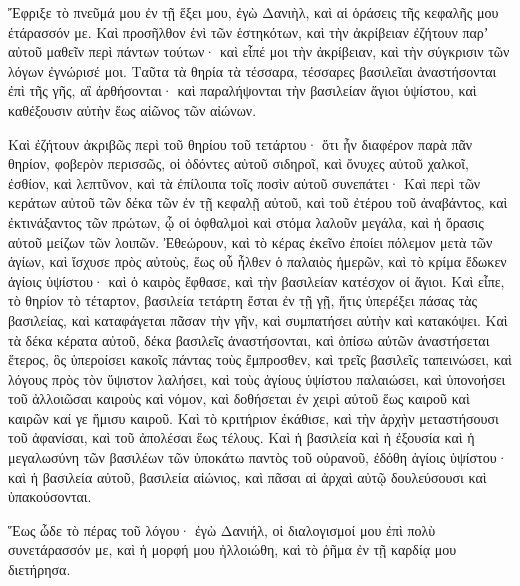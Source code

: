 {\par }{\PP {}Ἔφριξε τὸ πνεῦμά μου ἐν τῇ ἕξει μου, ἐγὼ Δανιὴλ, καὶ αἱ ὁράσεις τῆς κεφαλῆς μου ἐτάρασσόν με.
Καὶ προσῆλθον ἑνὶ τῶν ἑστηκότων, καὶ τὴν ἀκρίβειαν ἐζήτουν παρʼ αὐτοῦ μαθεῖν περὶ πάντων τούτων· καὶ εἶπέ μοι τὴν ἀκρίβειαν, καὶ τὴν σύγκρισιν τῶν λόγων ἐγνώρισέ μοι.
Ταῦτα τὰ θηρία τὰ τέσσαρα, τέσσαρες βασιλεῖαι ἀναστήσονται ἐπὶ τῆς γῆς, αἳ ἀρθήσονται·
καὶ παραλήψονται τὴν βασιλείαν ἅγιοι ὑψίστου, καὶ καθέξουσιν αὐτὴν ἕως αἰῶνος τῶν αἰώνων.
\par }{\PP {}Καὶ ἐζήτουν ἀκριβῶς περὶ τοῦ θηρίου τοῦ τετάρτου· ὅτι ἦν διαφέρον παρὰ πᾶν θηρίον, φοβερὸν περισσῶς, οἱ ὀδόντες αὐτοῦ σιδηροῖ, καὶ ὄνυχες αὐτοῦ χαλκοῖ, ἐσθίον, καὶ λεπτῦνον, καὶ τὰ ἐπίλοιπα τοῖς ποσὶν αὐτοῦ συνεπάτει·
Καὶ περὶ τῶν κεράτων αὐτοῦ τῶν δέκα τῶν ἐν τῇ κεφαλῇ αὐτοῦ, καὶ τοῦ ἐτέρου τοῦ ἀναβάντος, καὶ ἐκτινάξαντος τῶν πρώτων, ᾧ οἱ ὀφθαλμοὶ καὶ στόμα λαλοῦν μεγάλα, καὶ ἡ ὅρασις αὐτοῦ μείζων τῶν λοιπῶν.
Ἐθεώρουν, καὶ τὸ κέρας ἐκεῖνο ἐποίει πόλεμον μετὰ τῶν ἁγίων, καὶ ἴσχυσε πρὸς αὐτοὺς,
ἕως οὗ ἦλθεν ὁ παλαιὸς ἡμερῶν, καὶ τὸ κρίμα ἔδωκεν ἁγίοις ὑψίστου· καὶ ὁ καιρὸς ἔφθασε, καὶ τὴν βασιλείαν κατέσχον οἱ ἅγιοι.
Καὶ εἶπε, τὸ θηρίον τὸ τέταρτον, βασιλεία τετάρτη ἔσται ἐν τῇ γῇ, ἥτις ὑπερέξει πάσας τὰς βασιλείας, καὶ καταφάγεται πᾶσαν τὴν γῆν, καὶ συμπατήσει αὐτὴν καὶ κατακόψει.
Καὶ τὰ δέκα κέρατα αὐτοῦ, δέκα βασιλεῖς ἀναστήσονται, καὶ ὀπίσω αὐτῶν ἀναστήσεται ἕτερος, ὃς ὑπεροίσει κακοῖς πάντας τοὺς ἔμπροσθεν, καὶ τρεῖς βασιλεῖς ταπεινώσει,
καὶ λόγους πρὸς τὸν ὕψιστον λαλήσει, καὶ τοὺς ἁγίους ὑψίστου παλαιώσει, καὶ ὑπονοήσει τοῦ ἀλλοιῶσαι καιροὺς καὶ νόμον, καὶ δοθήσεται ἐν χειρὶ αὐτοῦ ἕως καιροῦ καὶ καιρῶν καί γε ἥμισυ καιροῦ.
Καὶ τὸ κριτήριον ἐκάθισε, καὶ τὴν ἀρχὴν μεταστήσουσι τοῦ ἀφανίσαι, καὶ τοῦ ἀπολέσαι ἕως τέλους.
Καὶ ἡ βασιλεία καὶ ἡ ἐξουσία καὶ ἡ μεγαλωσύνη τῶν βασιλέων τῶν ὑποκάτω παντὸς τοῦ οὐρανοῦ, ἐδόθη ἁγίοις ὑψίστου· καὶ ἡ βασιλεία αὐτοῦ, βασιλεία αἰώνιος, καὶ πᾶσαι αἱ ἀρχαὶ αὐτῷ δουλεύσουσι καὶ ὑπακούσονται.
\par }{\PP Ἕως ὧδε τὸ πέρας τοῦ λόγου·
ἐγὼ Δανιήλ, οἱ διαλογισμοί μου ἐπὶ πολὺ συνετάρασσόν με, καὶ ἡ μορφή μου ἠλλοιώθη, καὶ τὸ ῥῆμα ἐν τῇ καρδίᾳ μου διετήρησα.

}

